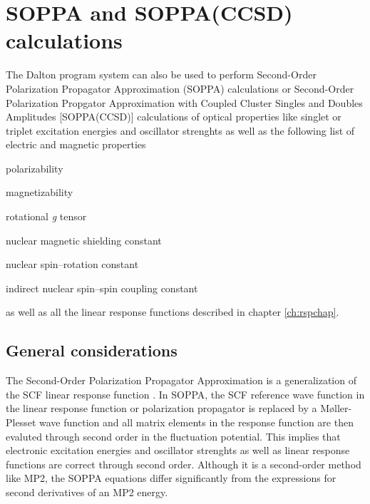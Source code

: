 \chapter{SOPPA and SOPPA(CCSD) calculations}\label{ch:soppa}

The Dalton program system can also be used to perform Second-Order
Polarization Propagator Approximation (SOPPA) 
 calculations
\cite{esnpjjodjcp73,mjpekdtehjajjojcp,spascpl260,tejospastcan100} or
Second-Order Polarization Propgator Approximation with Coupled Cluster
Singles and Doubles Amplitudes [SOPPA(CCSD)] 
calculations of optical properties like singlet or triplet excitation
energies and oscillator
strenghts as well as the 
following list of electric and magnetic properties
\begin{center}
\begin{list}{}{}
\item polarizability
\item magnetizability
\item rotational {\em g} tensor
\item nuclear magnetic shielding constant
\item nuclear spin--rotation constant
\item indirect nuclear spin--spin coupling constant
\end{list}
\end{center}
as well as all the linear response functions described in chapter
\ref{ch:rspchap}.


\section{General considerations}\label{sec:soppageneral}

The Second-Order Polarization Propagator Approximation is a generalization of
the SCF linear response function
\cite{esnpjjodjcp73,jopjdycpr2,mjpekdtehjajjojcp}. In SOPPA, the SCF reference
wave function in the linear response function or polarization propagator is
replaced by a M{\o}ller-Plesset wave function and all matrix elements in the
response function are then evaluted through second order in the fluctuation
potential. This implies that electronic excitation energies and oscillator
strenghts as well as linear response functions are correct through second
order. Although it is a second-order method like MP2, the SOPPA equations
differ significantly from the expressions for second derivatives of an MP2
energy. 

